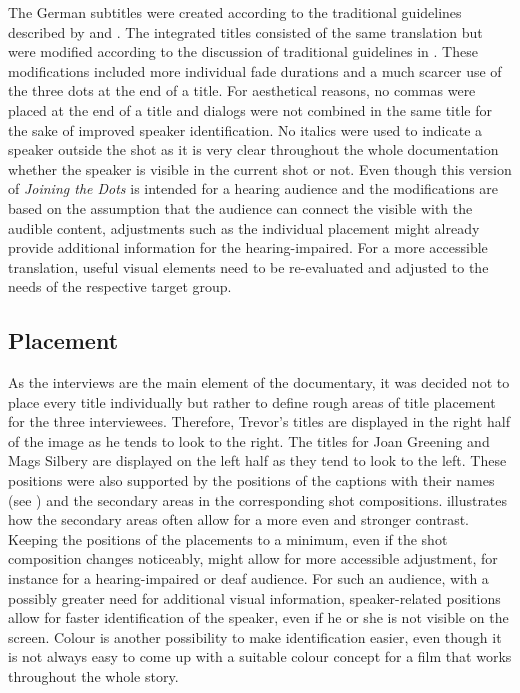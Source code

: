 \documentclass[output=paper]{langsci/langscibook}
\begin{document}
The German subtitles were created according to the traditional guidelines described by \citet{ivarsson1998} and \citet{karamitroglou1998}. The integrated titles consisted of the same translation but were modified according to the discussion of traditional guidelines in \citet{fox2012}. These modifications included more individual fade durations and a much scarcer use of the three dots at the end of a title. For aesthetical reasons, no commas were placed at the end of a title and dialogs were not combined in the same title for the sake of improved speaker identification. No italics were used to indicate a speaker outside the shot as it is very clear throughout the whole documentation whether the speaker is visible in the current shot or not. Even though this version of \textit{Joining the Dots} is intended for a hearing audience and the modifications are based on the assumption that the audience can connect the visible with the audible content, adjustments such as the individual placement might already provide additional information for the hearing-impaired. For a more accessible translation, useful visual elements need to be re-evaluated and adjusted to the needs of the respective target group.


\subsection{Placement}

As the interviews are the main element of the documentary, it was decided not to place every title individually but rather to define rough areas of title placement for the three interviewees. Therefore, Trevor's titles are displayed in the right half of the image as he tends to look to the right. The titles for Joan Greening and Mags Silbery are displayed on the left half as they tend to look to the left. These positions were also supported by the positions of the captions with their names (see ) and the secondary areas in the corresponding shot compositions.  illustrates how the secondary areas often allow for a more even and stronger contrast. Keeping the positions of the placements to a minimum, even if the shot composition changes noticeably, might allow for more accessible adjustment, for instance for a hearing-impaired or deaf audience. For such an audience, with a possibly greater need for additional visual information, speaker-related positions allow for faster identification of the speaker, even if he or she is not visible on the screen. Colour is another possibility to make identification easier, even though it is not always easy to come up with a suitable colour concept for a film that works throughout the whole story.
\end{document}
